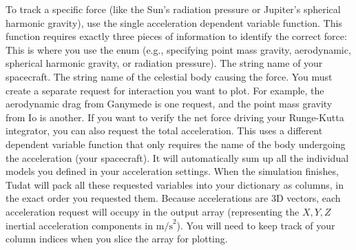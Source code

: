 {}
\markdownRendererSectionEnd \markdownRendererSectionBegin
{}\markdownRendererInterblockSeparator
{}To track a specific force (like the Sun's radiation pressure or Jupiter's spherical harmonic gravity), use the single acceleration dependent variable function. This function requires exactly three pieces of information to identify the correct force:\markdownRendererInterblockSeparator
{}\markdownRendererUlBegin
\markdownRendererUlItem {} This is where you use the  enum (e.g., specifying point mass gravity, aerodynamic, spherical harmonic gravity, or radiation pressure).\markdownRendererUlItemEnd 
\markdownRendererUlItem {} The string name of your spacecraft.\markdownRendererUlItemEnd 
\markdownRendererUlItem {} The string name of the celestial body causing the force.\markdownRendererUlItemEnd 
\markdownRendererUlEnd \markdownRendererInterblockSeparator
{}You must create a separate request for  interaction you want to plot. For example, the aerodynamic drag from Ganymede is one request, and the point mass gravity from Io is another.\markdownRendererInterblockSeparator
{}
\markdownRendererSectionEnd \markdownRendererSectionBegin
{}\markdownRendererInterblockSeparator
{}If you want to verify the net force driving your Runge-Kutta integrator, you can also request the total acceleration. This uses a different dependent variable function that only requires the name of the body undergoing the acceleration (your spacecraft). It will automatically sum up all the individual models you defined in your acceleration settings.\markdownRendererInterblockSeparator
{}
\markdownRendererSectionEnd \markdownRendererSectionBegin
{}\markdownRendererInterblockSeparator
{}When the simulation finishes, Tudat will pack all these requested variables into your  dictionary as columns, in the exact order you requested them.\markdownRendererInterblockSeparator
{}Because accelerations are 3D vectors, each acceleration request will occupy  in the output array (representing the $X, Y, Z$ inertial acceleration components in $\text{m/s}^2$). You will need to keep track of your column indices when you slice the array for plotting.\markdownRendererInterblockSeparator

